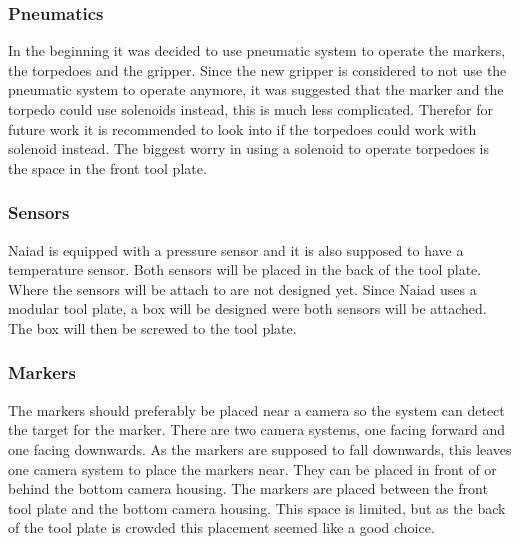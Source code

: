 	\subsubsection{Pneumatics}
In the beginning it was decided to use pneumatic system to operate the markers, the torpedoes and the gripper. Since the new gripper is considered to not use the pneumatic system to operate anymore, it was suggested that the marker and the torpedo could use solenoids instead, this is much less complicated. Therefor for future work it is recommended to look into if the torpedoes could work with solenoid instead. The biggest worry in using a solenoid to operate torpedoes is the space in the front tool plate.

	\subsubsection{Sensors}
Naiad is equipped with a pressure sensor and it is also supposed to have a temperature sensor. Both sensors will be placed in the back of the tool plate. Where the sensors will be attach to are not designed yet. Since Naiad uses a modular tool plate, a box will be designed were both sensors will be attached. The box will then be screwed to the tool plate.
	
	\subsubsection{Markers} %
	\label{Markerss}
	\noindent The markers should preferably be placed near a camera so the system can detect the target for the marker. There are two camera systems, one facing forward and one facing downwards. As the markers are supposed to fall downwards, this leaves one camera system to place the markers near. They can be placed in front of or behind the bottom camera housing. The markers are placed between the front tool plate and the bottom camera housing. This space is limited, but as the back of the tool plate is crowded this placement seemed like a good choice.
